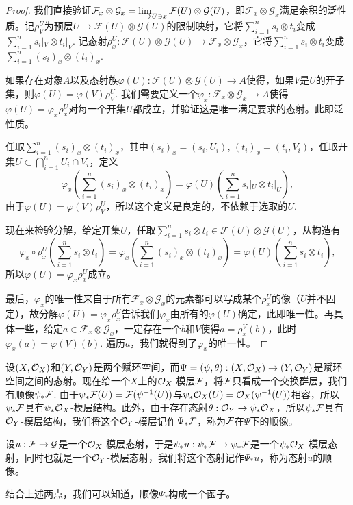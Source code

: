 \begin{proof}
我们直接验证$\mathcal{F}_x\otimes\mathcal{G}_x=\varinjlim_{U\ni x} \mathcal{F}(U)\otimes\mathcal{G}(U)$，即$\mathcal{F}_x\otimes\mathcal{G}_x$满足余积的泛性质。记$\rho^U_V$为预层$U\mapsto \mathcal{F}(U)\otimes \mathcal{G}(U)$的限制映射，它将$\sum_{i=1}^n s_i\otimes t_i$变成$\sum_{i=1}^n s_i|_V\otimes t_i|_V$. 记态射$\rho^U_x:\mathcal{F}(U)\otimes \mathcal{G}(U)\to \mathcal{F}_x\otimes\mathcal{G}_x$，它将$\sum_{i=1}^n s_i\otimes t_i$变成$\sum_{i=1}^n (s_i)_x\otimes (t_i)_x$.

如果存在对象$A$以及态射族$\varphi(U):\mathcal{F}(U)\otimes \mathcal{G}(U)\to A$使得，如果$V$是$U$的开子集，则$\varphi(U)=\varphi(V)\rho^U_V$. 我们需要定义一个$\varphi_x:\mathcal{F}_x\otimes\mathcal{G}_x\to A$使得$\varphi(U)=\varphi_x \rho^U_x$对每一个开集$U$都成立，并验证这是唯一满足要求的态射。此即泛性质。

任取$\sum_{i=1}^n (s_i)_x\otimes (t_i)_x$，其中$(s_i)_x=(s_i,U_i)$, $(t_i)_x=(t_i,V_i)$，任取开集$U\subset \bigcap_{i=1}^n U_i\cap V_i$，定义
\[
	\varphi_x\left(\sum_{i=1}^n (s_i)_x\otimes (t_i)_x\right)=\varphi(U)\left(\sum_{i=1}^n s_i|_U\otimes t_i|_U\right),
\]
由于$\varphi(U)=\varphi(V)\rho^U_V$，所以这个定义是良定的，不依赖于选取的$U$.

现在来检验分解，给定开集$U$，任取$\sum_{i=1}^n s_i\otimes t_i\in \mathcal{F}(U)\otimes \mathcal{G}(U)$，从构造有
\[
	\varphi_x\circ \rho^U_x\left(\sum_{i=1}^n s_i\otimes t_i\right)=\varphi_x\left(\sum_{i=1}^n (s_i)_x\otimes (t_i)_x\right)=\varphi(U)\left(\sum_{i=1}^n s_i\otimes t_i\right),
\]
所以$\varphi(U)=\varphi_x \rho^U_x$成立。

最后，$\varphi_x$的唯一性来自于所有$\mathcal{F}_x\otimes\mathcal{G}_x$的元素都可以写成某个$\rho_x^U$的像（$U$并不固定），故分解$\varphi(U)=\varphi_x \rho^U_x$告诉我们$\varphi_x$由所有的$\varphi(U)$确定，此即唯一性。再具体一些，给定$a\in \mathcal{F}_x\otimes\mathcal{G}_x$，一定存在一个$b$和$V$使得$a=\rho^V_x(b)$，此时$\varphi_x(a)=\varphi(V)(b)$. 遍历$a$，我们就得到了$\varphi_x$的唯一性。
\end{proof}

\begin{para}[顺像]
设$(X,\mathcal{O}_X)$和$(Y,\mathcal{O}_Y)$是两个赋环空间，而$\Psi=(\psi,\theta):(X,\mathcal{O}_X)\to (Y,\mathcal{O}_Y)$是赋环空间之间的态射。现在给一个$X$上的$\mathcal{O}_X$-模层$\mathcal{F}$，将$\mathcal{F}$只看成一个交换群层，我们有顺像$\psi_*\mathcal{F}$. 由于$\psi_*\mathcal{F}(U)=\mathcal{F}(\psi^{-1}(U))$与$\psi_*\mathcal{O}_X(U)=\mathcal{O}_X(\psi^{-1}(U))$相容，所以$\psi_*\mathcal{F}$具有$\psi_*\mathcal{O}_X$-模层结构。此外，由于存在态射$\theta:\mathcal{O}_Y\to \psi_*\mathcal{O}_X$，所以$\psi_*\mathcal{F}$具有$\mathcal{O}_Y$-模层结构，我们将这个$\mathcal{O}_Y$-模层记作$\Psi_*\mathcal{F}$，称为$\mathcal{F}$在$\Psi$下的顺像。

设$u:\mathcal{F}\to\mathcal{G}$是一个$\mathcal{O}_X$-模层态射，于是$\psi_*u:\psi_*\mathcal{F}\to\psi_*\mathcal{F}$是一个$\psi_*\mathcal{O}_X$-模层态射，同时也就是一个$\mathcal{O}_Y$-模层态射，我们将这个态射记作$\Psi_*u$，称为态射$u$的顺像。

结合上述两点，我们可以知道，顺像$\Psi_*$构成一个函子。
\end{para}

